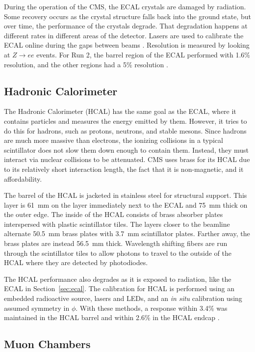 During the operation of the CMS, the ECAL crystals are damaged by radiation.
Some recovery occurs as the crystal structure falls back into the ground state,
but over time, the performance of the crystals degrade.
That degradation happens at different rates in different areas of the detector.
Lasers are used to calibrate the ECAL online during the gaps between beams \cite{Monti:2653861}.
Resolution is measured by looking at $Z\rightarrow ee$ events.
For Run 2, the barrel region of the ECAL performed with 1.6\% resolution, and the other regions had a 5\% resolution \cite{Bartosik:2712238}.

\subsection{Hadronic Calorimeter}

The Hadronic Calorimeter (HCAL) has the same goal as the ECAL,
where it contains particles and measures the energy emitted by them.
However, it tries to do this for hadrons, such as protons, neutrons, and stable mesons.
Since hadrons are much more massive than electrons,
the ionizing collisions in a typical scintillator does not slow them down enough to contain them.
Instead, they must interact via nuclear collisions to be attenuated.
CMS uses brass for its HCAL due to its relatively short interaction length,
the fact that it is non-magnetic, and it affordability.

The barrel of the HCAL is jacketed in stainless steel for structural support.
This layer is \SI{61}{mm} on the layer immediately next to the ECAL and \SI{75}{mm} thick on the outer edge.
The inside of the HCAL consists of brass absorber plates interspersed with plastic scintillator tiles.
The layers closer to the beamline alternate \SI{50.5}{mm} brass plates with \SI{3.7}{mm} scintillator plates.
Farther away, the brass plates are instead \SI{56.5}{mm} thick.
Wavelength shifting fibers are run through the scintillator tiles
to allow photons to travel to the outside of the HCAL where they are detected by photodiodes.

The HCAL performance also degrades as it is exposed to radiation, like the ECAL in Section~\ref{sec:ecal}.
The calibration for HCAL is performed using an embedded radioactive source,
lasers and LEDs, and an \emph{in situ} calibration using assumed symmetry in $\phi$.
With these methods, a response within 3.4\% was maintained in the HCAL barrel
and within 2.6\% in the HCAL endcap \cite{Chadeeva_2018}.

\subsection{Muon Chambers}


